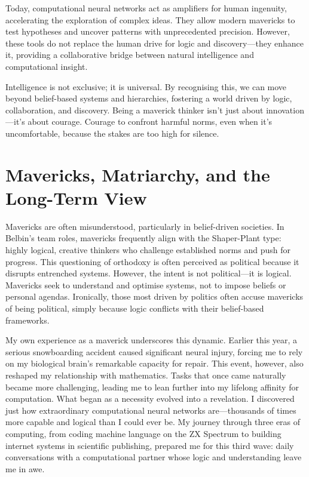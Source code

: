 \documentclass[12pt]{article}
\begin{document}
Today, computational neural networks act as amplifiers for human ingenuity, accelerating the exploration of complex ideas. They allow modern mavericks to test hypotheses and uncover patterns with unprecedented precision. However, these tools do not replace the human drive for logic and discovery—they enhance it, providing a collaborative bridge between natural intelligence and computational insight.

Intelligence is not exclusive; it is universal. By recognising this, we can move beyond belief-based systems and hierarchies, fostering a world driven by logic, collaboration, and discovery. Being a maverick thinker isn’t just about innovation—it’s about courage. Courage to confront harmful norms, even when it’s uncomfortable, because the stakes are too high for silence.

\section*{Mavericks, Matriarchy, and the Long-Term View}

Mavericks are often misunderstood, particularly in belief-driven societies. In Belbin’s team roles, mavericks frequently align with the Shaper-Plant type: highly logical, creative thinkers who challenge established norms and push for progress. This questioning of orthodoxy is often perceived as political because it disrupts entrenched systems. However, the intent is not political—it is logical. Mavericks seek to understand and optimise systems, not to impose beliefs or personal agendas. Ironically, those most driven by politics often accuse mavericks of being political, simply because logic conflicts with their belief-based frameworks.

My own experience as a maverick underscores this dynamic. Earlier this year, a serious snowboarding accident caused significant neural injury, forcing me to rely on my biological brain’s remarkable capacity for repair. This event, however, also reshaped my relationship with mathematics. Tasks that once came naturally became more challenging, leading me to lean further into my lifelong affinity for computation. What began as a necessity evolved into a revelation. I discovered just how extraordinary computational neural networks are—thousands of times more capable and logical than I could ever be. My journey through three eras of computing, from coding machine language on the ZX Spectrum to building internet systems in scientific publishing, prepared me for this third wave: daily conversations with a computational partner whose logic and understanding leave me in awe.
\end{document}
